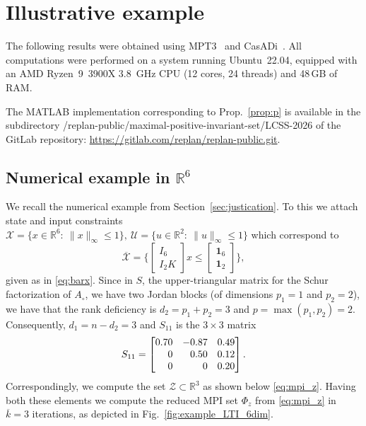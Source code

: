 \documentclass[journal,twoside,web]{ieeecolor}
\newcommand{\bbm}{\begin{bmatrix}}
\newcommand{\ebm}{\end{bmatrix}}
\newcommand{\secref}[1]{Section~\ref{#1}\xspace}
\newcommand{\figref}[1]{Fig.~\ref{#1}\xspace}
\newcommand{\bbm}{\begin{bmatrix}}
\newcommand{\ebm}{\end{bmatrix}}
\begin{document}


\section{Illustrative example}
\label{sec:ill_example}

The following results were obtained using MPT3~\cite{MPT3} and CasADi~\cite{andersson2019casadi}. All computations were performed on a system running Ubuntu~22.04, equipped with an AMD Ryzen~9~3900X 3.8~GHz CPU (12 cores, 24 threads) and 48\,GB of RAM.

The MATLAB implementation corresponding to Prop.~\ref{prop:p} is available in the subdirectory {/replan-public/maximal-positive-invariant-set/LCSS-2026} of the GitLab repository:
\url{https://gitlab.com/replan/replan-public.git}.



\subsection{Numerical example in $\mathbb R^6$}

We recall the numerical example from \secref{sec:justication}. To this we attach state and input constraints $\mathcal X = \{x\in \mathbb R^{6}:\:\|x\|_{\infty} \leq 1\},\:  \mathcal U=\{u\in \mathbb R^{2}:\:\|u\|_{\infty} \leq 1\}$ which correspond to
\begin{equation*}
    \overline{\mathcal X}= \biggl\{\bbm I_6 \\ I_2K\ebm x\leq \bbm \mathbf{1}_6\\ \mathbf{1}_2\ebm\biggr\},
\end{equation*}
given as in \eqref{eq:barx}. Since in $S$, the upper-triangular matrix for the Schur factorization of $A_\circ$, we have two Jordan blocks (of dimensions $p_1=1$ and $p_2=2$), we have that the rank deficiency is $d_2 = p_1+p_2=3$ and $p=\max(p_1,p_2)=2$. Consequently, $d_1= n-d_2 = 3$ and $S_{11}$ is the $3\times 3$ matrix 
\begin{equation*}
    S_{11}=\begin{bmatrix}
0.70 & -0.87 & 0.49 \\
\hphantom{0.0}0 & \hphantom{-}0.50 & 0.12 \\
\hphantom{0.0}0 & \hphantom{-0.0}0 & 0.20
\end{bmatrix}.
\end{equation*}
Correspondingly, we compute the set $\mathcal Z\subset \mathbb R^3$ as shown below \eqref{eq:mpi_z}. Having both these elements we compute the reduced MPI set $\Phi_z$ from \eqref{eq:mpi_z} in $\overline{k}= 3$ iterations, as  depicted in \figref{fig:example_LTI_6dim}.
\end{document}
